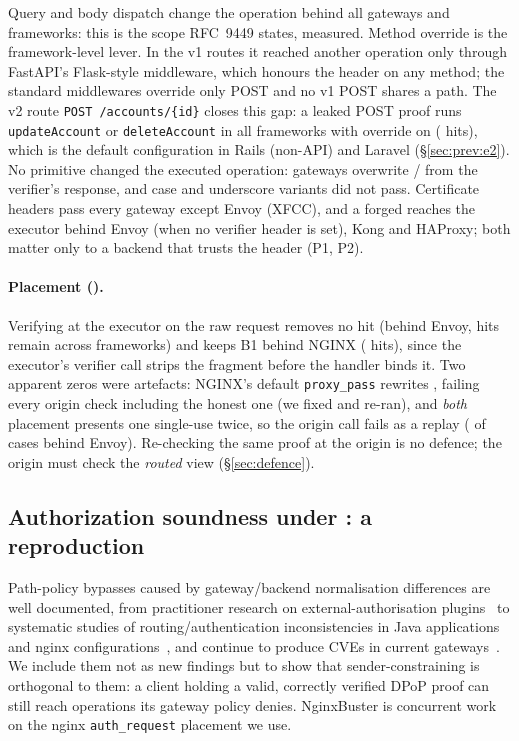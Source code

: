 Query and body dispatch change the operation behind all \NumGateways{}
gateways and \NumFrameworks{} frameworks: this is the scope RFC~9449 states,
measured. Method override is the framework-level lever. In the v1 routes it
reached another operation only through FastAPI's Flask-style middleware, which
honours the header on any method; the standard middlewares override only POST
and no v1 POST shares a path. The v2 route \texttt{POST /accounts/\{id\}}
closes this gap: a leaked POST proof runs \texttt{updateAccount} or
\texttt{deleteAccount} in all \NumFrameworks{} frameworks with override on
(\NumHitsOverrideVTwo{} hits), which is the default configuration in Rails
(non-API) and Laravel (\S\ref{sec:prev:e2}).
No \GC primitive changed the executed operation: gateways overwrite
/ from the verifier's response, and case and
underscore variants did not pass. Certificate headers pass every gateway
except Envoy (XFCC), and a forged  reaches the executor
behind Envoy (when no verifier header is set), Kong and HAProxy; both matter
only to a backend that trusts the header (P1, P2).

\paragraph{Placement ().} Verifying at the executor on the raw request
removes no \GA hit (behind Envoy, \NumHitsEnvoyOrigin{} hits remain across
\NumFrameworks{} frameworks) and keeps B1 behind NGINX
(\NumHitsNginxOriginFixed{} hits), since the executor's verifier call strips
the fragment before the handler binds it. Two apparent zeros were artefacts:
NGINX's default \texttt{proxy\_pass} rewrites , failing every origin
check including the honest one (we fixed  and re-ran), and
\emph{both} placement presents one single-use \jti twice, so the origin call
fails as a replay (\NumJtiReplayEnvoyBoth{} of \NumCasesVOne{} cases behind
Envoy). Re-checking the same proof at the origin is no defence; the origin
must check the \emph{routed} view (\S\ref{sec:defence}).

\subsection{Authorization soundness under \Aclient: a reproduction}\label{sec:results:e4}

Path-policy bypasses caused by gateway/backend normalisation differences are
well documented, from practitioner research on external-authorisation
plugins~\cite{p2:xvnpw2021kong,p2:xvnpw2022ingress,p2:tsai2018breaking} to
systematic studies of routing/authentication inconsistencies in Java
applications~\cite{p2:zhang2025uabscan} and nginx
configurations~\cite{p2:sadeghi2026nginxbuster}, and continue to produce CVEs
in current gateways~\cite{p2:traefik2026_88009,p2:apisix2026_124680,p2:envoy2026_73551}.
We include them not as new findings but to show that sender-constraining is
orthogonal to them: a client holding a valid, correctly verified DPoP proof
can still reach operations its gateway policy denies. NginxBuster is
concurrent work on the nginx \texttt{auth\_request} placement we use.

